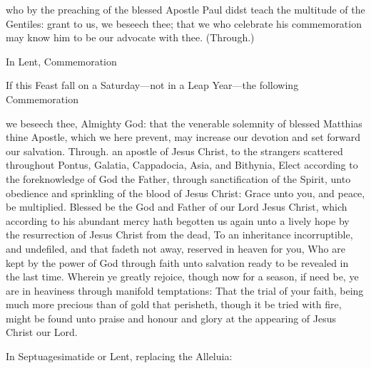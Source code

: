  who by the preaching of the blessed Apostle Paul didst teach the multitude of the Gentiles: grant to us, we beseech thee; that we who celebrate his commemoration may know him to be our advocate with thee. (Through.)
\begin{rubric}
    In Lent, Commemoration %
\end{rubric}
\begin{rubric}
    If this Feast fall on a Saturday---not in a Leap Year---the following Commemoration 
\end{rubric}

 we beseech thee, Almighty God: that the venerable solemnity of blessed Matthias thine Apostle, which we here prevent, may increase our devotion and set forward our salvation. Through.
 an apostle of Jesus Christ, to the strangers scattered throughout Pontus, Galatia, Cappadocia, Asia, and Bithynia, Elect according to the foreknowledge of God the Father, through sanctification of the Spirit, unto obedience and sprinkling of the blood of Jesus Christ: Grace unto you, and peace, be multiplied. Blessed be the God and Father of our Lord Jesus Christ, which according to his abundant mercy hath begotten us again unto a lively hope by the resurrection of Jesus Christ from the dead, To an inheritance incorruptible, and undefiled, and that fadeth not away, reserved in heaven for you, Who are kept by the power of God through faith unto salvation ready to be revealed in the last time. Wherein ye greatly rejoice, though now for a season, if need be, ye are in heaviness through manifold temptations: That the trial of your faith, being much more precious than of gold that perisheth, though it be tried with fire, might be found unto praise and honour and glory at the appearing of Jesus Christ our Lord.


\begin{rubric}
{In Septuagesimatide or Lent, replacing the Alleluia:}
\end{rubric}\par\noindent

